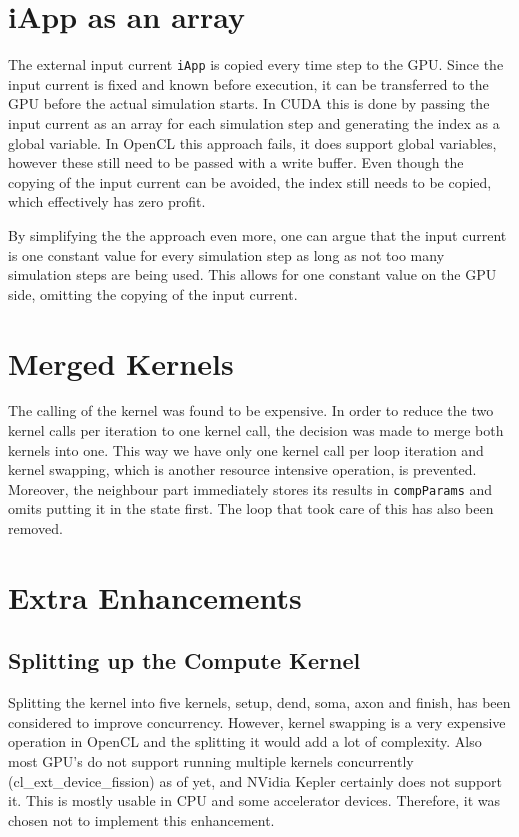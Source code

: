 \documentclass[final]{report}
\begin{document}
\section{iApp as an array}\label{sec:iapp-array}
The external input current \texttt{iApp} is copied every time step to the GPU.
Since the input current is fixed and known before execution, it can be transferred to the GPU before the actual simulation starts.
In CUDA this is done by passing the input current as an array for each simulation step and generating the index as a global variable.
In OpenCL this approach fails, it does support global variables, however these still need to be passed with a write buffer.
Even though the copying of the input current can be avoided, the index still needs to be copied, which effectively has zero profit.

By simplifying the the approach even more, one can argue that the input current is one constant value for every simulation step as long as not too many simulation steps are being used.
This allows for one constant value on the GPU side, omitting the copying of the input current.

\section{Merged Kernels}\label{sec:one-kernel}
The calling of the kernel was found to be expensive.
In order to reduce the two kernel calls per iteration to one kernel call, the decision was made to merge both kernels into one.
This way we have only one kernel call per loop iteration and kernel swapping, which is another resource intensive operation, is prevented.
Moreover, the neighbour part immediately stores its results in \texttt{compParams} and omits putting it in the state first.
The loop that took care of this has also been removed.

\section{Extra Enhancements}
\subsection{Splitting up the Compute Kernel}
Splitting the kernel into five kernels, setup, dend, soma, axon and finish, has been considered to improve concurrency.
However, kernel swapping is a very expensive operation in OpenCL and the splitting it would add a lot of complexity.
Also most GPU's do not support running multiple kernels concurrently (cl\_ext\_device\_fission) as of yet, and NVidia Kepler certainly does not support it.
This is mostly usable in CPU and some accelerator devices.
Therefore, it was chosen not to implement this enhancement.
\end{document}
